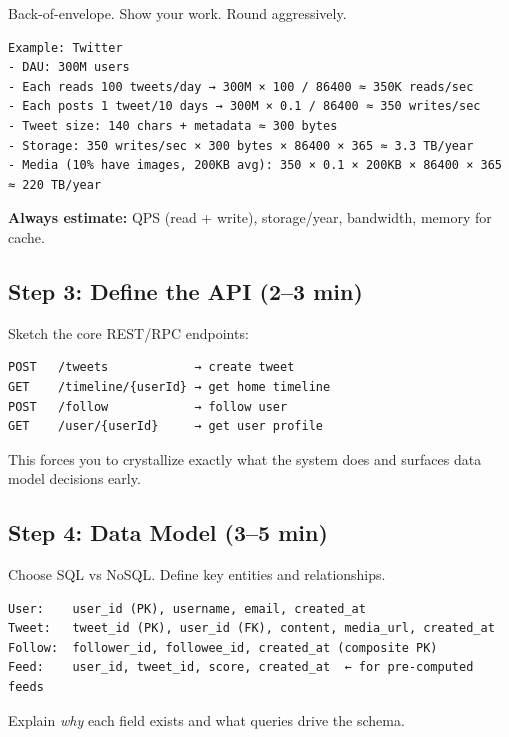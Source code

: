\documentclass[11pt]{article}
\begin{document}
Back-of-envelope. Show your work. Round aggressively.

\setcodelang{}

\begin{verbatim}
Example: Twitter
- DAU: 300M users
- Each reads 100 tweets/day → 300M × 100 / 86400 ≈ 350K reads/sec
- Each posts 1 tweet/10 days → 300M × 0.1 / 86400 ≈ 350 writes/sec
- Tweet size: 140 chars + metadata ≈ 300 bytes
- Storage: 350 writes/sec × 300 bytes × 86400 × 365 ≈ 3.3 TB/year
- Media (10% have images, 200KB avg): 350 × 0.1 × 200KB × 86400 × 365 ≈ 220 TB/year
\end{verbatim}

\textbf{Always estimate:} QPS (read + write), storage/year, bandwidth, memory for cache.

\subsection{Step 3: Define the API (2--3 min)}\label{step-3-define-the-api-23-min}

Sketch the core REST/RPC endpoints:

\setcodelang{}

\begin{verbatim}
POST   /tweets            → create tweet
GET    /timeline/{userId} → get home timeline
POST   /follow            → follow user
GET    /user/{userId}     → get user profile
\end{verbatim}

This forces you to crystallize exactly what the system does and surfaces data model decisions early.

\subsection{Step 4: Data Model (3--5 min)}\label{step-4-data-model-35-min}

Choose SQL vs NoSQL. Define key entities and relationships.

\setcodelang{}

\begin{verbatim}
User:    user_id (PK), username, email, created_at
Tweet:   tweet_id (PK), user_id (FK), content, media_url, created_at
Follow:  follower_id, followee_id, created_at (composite PK)
Feed:    user_id, tweet_id, score, created_at  ← for pre-computed feeds
\end{verbatim}

Explain \emph{why} each field exists and what queries drive the schema.
\end{document}
